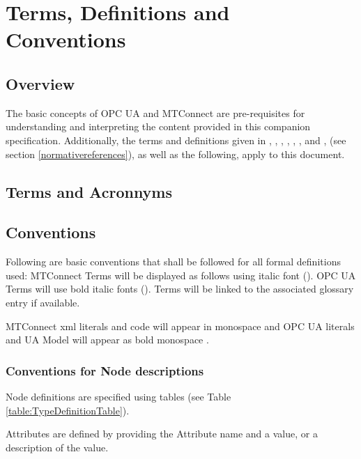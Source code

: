 \section{Terms, Definitions and Conventions}\label{termsdefinitionsconventions}

\subsection{Overview}

The basic concepts of OPC UA and MTConnect are pre-requisites for understanding and interpreting the content provided in this companion specification. Additionally, the terms and definitions given in \cite{UAPart1}, \cite{UAPart2}, \cite{UAPart3}, \cite{UAPart5}, \cite{UAPart7}, \cite{UAPart10}, and \cite{MTCPart1}, (see section \ref{normativereferences}), as well as the following, apply to this document. 

\subsection{Terms and Acronnyms}

\printglossary[type=opc]

\printglossary[type=mtc]

\printacronyms  

\subsection{Conventions}\label{conventions}
Following are basic conventions that shall be followed for all formal definitions used: MTConnect Terms will be displayed as follows using italic font (). OPC UA Terms will use bold italic fonts (). Terms will be linked to the associated glossary entry if available.

MTConnect \gls{xml} literals and code will appear in monospace  and OPC UA literals and UA Model will appear as bold monospace .

\subsubsection{Conventions for Node descriptions}

\gls{Node} definitions are specified using tables (see Table \ref{table:TypeDefinitionTable}).

\glspl{Attribute} are defined by providing the Attribute name and a value, or a description of the value.

